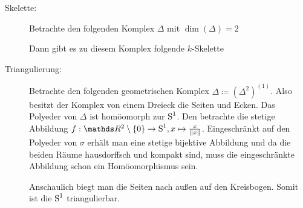 \begin{Bsp}\label{bsp:triangulierung}
  \begin{description}
  \item[Skelette:] Betrachte den folgenden Komplex $\Delta$ mit $\dim(\Delta)=2$\\
    \begin{center}
  \end{center}
  Dann gibt es zu diesem Komplex folgende $k$-Skelette\\
  \begin{center}
    \parbox{0.7\linewidth}{%
  \hfill
  }
\end{center}  

\item[Triangulierung:] Betrachte den folgenden geometrischen Komplex
  $\Delta \coloneqq (\Delta^2)^{(1)}$. Also besitzt der Komplex von
  einem Dreieck die Seiten und Ecken. Das Polyeder von $\Delta$ ist
  homöomorph zur $\operatorname{S}^1$. Den betrachte die stetige Abbildung
  $f : \R^2 \setminus \sset{0} \rightarrow \Sp^1 , x \mapsto
  \frac{x}{\nn[x]}$.
  Eingeschränkt auf den Polyeder von $\sigma$ erhält man eine stetige
  bijektive Abbildung und da die beiden Räume hausdorffsch und kompakt
  sind, muss die eingeschränkte Abbildung schon ein Homöomorphismus
  sein.
  \begin{center}
\end{center}
Anschaulich biegt man die Seiten nach außen auf den Kreisbogen. Somit
ist die $\operatorname{S}^1$ triangulierbar.
\end{description}
\end{Bsp}

